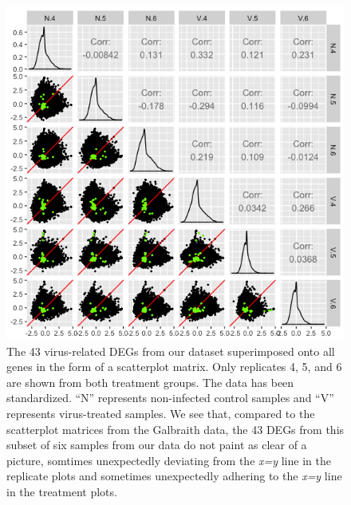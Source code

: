 \documentclass[11pt,a4paper,oldfontcommands,openany]{memoir}
\numberwithin{equation}{section} %
\begin{document}
\begin{figure}[H]
\begin{framed}
  \includegraphics[width=\textwidth]{Images/RutterSM2}
\end{framed}
  \caption{The 43 virus-related DEGs from our dataset superimposed onto all genes in the form of a scatterplot matrix. Only replicates 4, 5, and 6 are shown from both treatment groups. The data has been standardized. ``N'' represents non-infected control samples and ``V'' represents virus-treated samples. We see that, compared to the scatterplot matrices from the Galbraith data, the 43 DEGs from this subset of six samples from our data do not paint as clear of a picture, somtimes unexpectedly deviating from the \textit{x=y} line in the replicate plots and sometimes unexpectedly adhering to the \textit{x=y} line in the treatment plots.}
  \label{fig:RutterSM2}
\end{figure}
\end{document}
